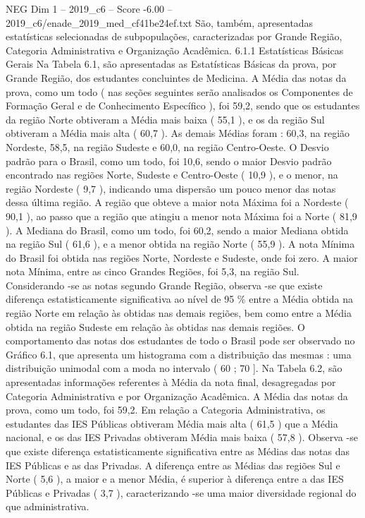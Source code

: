\begin{textsample}{NEG Dim 1 – 2019\_c6 – Score -6.00 – 2019\_c6/enade\_2019\_med\_cf41be24ef.txt}
São, também, apresentadas estatísticas selecionadas de subpopulações, caracterizadas por Grande Região, Categoria Administrativa e Organização Acadêmica. 6.1.1 Estatísticas Básicas Gerais Na Tabela 6.1, são apresentadas as Estatísticas Básicas da prova, por Grande Região, dos estudantes concluintes de Medicina.
A Média das notas da prova, como um todo ( nas seções seguintes serão analisados os Componentes de Formação Geral e de Conhecimento Específico ), foi 59,2, sendo que os estudantes da região Norte obtiveram a Média mais baixa ( 55,1 ), e os da região Sul obtiveram a Média mais alta ( 60,7 ).
As demais Médias foram : 60,3, na região Nordeste, 58,5, na região Sudeste e 60,0, na região Centro-Oeste.
O Desvio padrão para o Brasil, como um todo, foi 10,6, sendo o maior Desvio padrão encontrado nas regiões Norte, Sudeste e Centro-Oeste ( 10,9 ), e o menor, na região Nordeste ( 9,7 ), indicando uma dispersão um pouco menor das notas dessa última região.
A região que obteve a maior nota Máxima foi a Nordeste ( 90,1 ), ao passo que a região que atingiu a menor nota Máxima foi a Norte ( 81,9 ).
A Mediana do Brasil, como um todo, foi 60,2, sendo a maior Mediana obtida na região Sul ( 61,6 ), e a menor obtida na região Norte ( 55,9 ).
A nota Mínima do Brasil foi obtida nas regiões Norte, Nordeste e Sudeste, onde foi zero.
A maior nota Mínima, entre as cinco Grandes Regiões, foi 5,3, na região Sul.
Considerando -se as notas segundo Grande Região, observa -se que existe diferença estatisticamente significativa ao nível de 95 \% entre a Média obtida na região Norte em relação às obtidas nas demais regiões, bem como entre a Média obtida na região Sudeste em relação às obtidas nas demais regiões.
O comportamento das notas dos estudantes de todo o Brasil pode ser observado no Gráfico 6.1, que apresenta um histograma com a distribuição das mesmas : uma distribuição unimodal com a moda no intervalo ( 60 ; 70 ].
Na Tabela 6.2, são apresentadas informações referentes à Média da nota final, desagregadas por Categoria Administrativa e por Organização Acadêmica.
A Média das notas da prova, como um todo, foi 59,2.
Em relação a Categoria Administrativa, os estudantes das IES Públicas obtiveram Média mais alta ( 61,5 ) que a Média nacional, e os das IES Privadas obtiveram Média mais baixa ( 57,8 ).
Observa -se que existe diferença estatisticamente significativa entre as Médias das notas das IES Públicas e as das Privadas.
A diferença entre as Médias das regiões Sul e Norte ( 5,6 ), a maior e a menor Média, é superior à diferença entre a das IES Públicas e Privadas ( 3,7 ), caracterizando -se uma maior diversidade regional do que administrativa.

\end{textsample}
